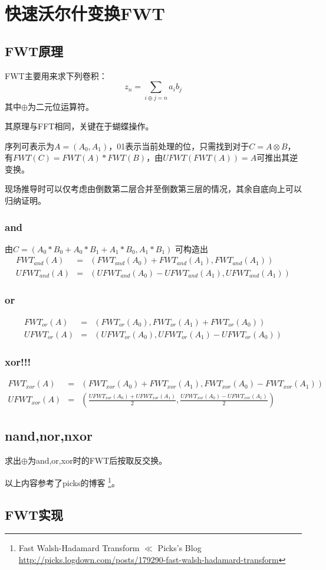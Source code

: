 \section{快速沃尔什变换FWT}
\subsection{FWT原理}
FWT主要用来求下列卷积：
\begin{displaymath}
    z_n=\sum_{i\oplus j=n}{a_ib_j}
\end{displaymath}
其中$\oplus$为二元位运算符。

其原理与FFT相同，关键在于蝴蝶操作。

序列可表示为$A=(A_0,A_1)$，01表示当前处理的位，只需找到对于$C=A\otimes B$，
有$FWT(C)=FWT(A)*FWT(B)$，由$UFWT(FWT(A))=A$可推出其逆变换。


现场推导时可以仅考虑由倒数第二层合并至倒数第三层的情况，其余自底向上可以归纳证明。

\subsubsection{and}
由$C=(A_0*B_0+A_0*B_1+A_1*B_0,A_1*B_1)$
可构造出
\begin{eqnarray*}
    FWT_{and}(A)&=&(FWT_{and}(A_0)+FWT_{and}(A_1),FWT_{and}(A_1))\\
    UFWT_{and}(A)&=&(UFWT_{and}(A_0)-UFWT_{and}(A_1),UFWT_{and}(A_1))
\end{eqnarray*}
\subsubsection{or}
\begin{eqnarray*}
    FWT_{or}(A)&=&(FWT_{or}(A_0),FWT_{or}(A_1)+FWT_{or}(A_0))\\
    UFWT_{or}(A)&=&(UFWT_{or}(A_0),UFWT_{or}(A_1)-UFWT_{or}(A_0))
\end{eqnarray*}
\subsubsection{xor!!!}
\begin{eqnarray*}
    FWT_{xor}(A)&=&(FWT_{xor}(A_0)+FWT_{xor}(A_1),FWT_{xor}(A_0)-FWT_{xor}(A_1))\\
    UFWT_{xor}(A)&=&\left(\frac{UFWT_{xor}(A_0)+UFWT_{xor}(A_1)}{2},
    \frac{UFWT_{xor}(A_0)-UFWT_{xor}(A_1)}{2}\right)
\end{eqnarray*}
\subsection{nand,nor,nxor}
求出$\oplus$为and,or,xor时的FWT后按取反交换。

以上内容参考了picks的博客
\footnote{Fast Walsh-Hadamard Transform $\ll$ Picks's Blog\\
    \url{http://picks.logdown.com/posts/179290-fast-walsh-hadamard-transform}}。
\subsection{FWT实现}


